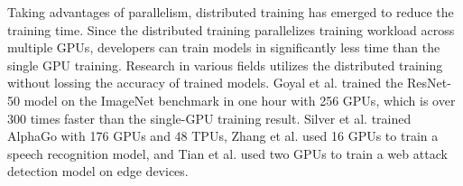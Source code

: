 Taking advantages of parallelism, distributed training has emerged to reduce
the training time. 
Since the distributed training parallelizes training workload across multiple
GPUs, developers can train models in significantly less time than the single
GPU training.
Research in various fields utilizes the distributed training without lossing
the accuracy of trained models.
Goyal et al.\cite{facebook2018} trained the ResNet-50 model on the ImageNet
benchmark in one hour with 256 GPUs, which is over 300 times faster than the
single-GPU training result.
Silver et al.\cite{Silver2017alphagozero} trained AlphaGo with 176
GPUs and 48 TPUs, Zhang et al.\cite{zhang2019distrspeech} used 16 GPUs to train
a speech recognition model, and Tian et al.\cite{tian2020distrwebattack} used
two GPUs to train a web attack detection model on edge devices.




